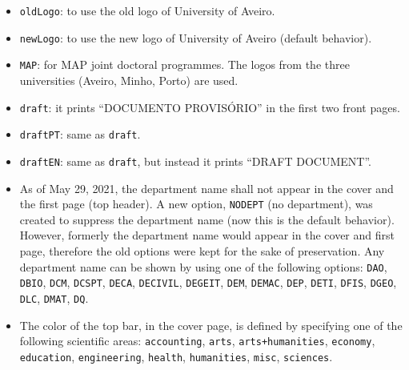 \begin{itemize}

\item
\texttt{oldLogo}: to use the old logo of University of Aveiro.

\item
\texttt{newLogo}: to use the new logo of University of Aveiro (default behavior).

\item
\texttt{MAP}: for MAP joint doctoral programmes. The logos from the three universities (Aveiro, Minho, Porto) are used.

\item
\texttt{draft}: it prints ``DOCUMENTO PROVISÓRIO'' in the first two front pages.

\item
\texttt{draftPT}: same as \texttt{draft}.

\item
\texttt{draftEN}: same as \texttt{draft}, but instead it prints ``DRAFT DOCUMENT''.

\item
As of May 29, 2021, the department name shall not appear in the cover and the first page (top header).
A new option, \texttt{NODEPT} (no department), was created to suppress the department name (now this is the default behavior).\\
However, formerly the department name would appear in the cover and first page, therefore the old options were kept for the sake of preservation.
Any department name can be shown by using one of the following options: \texttt{DAO}, \texttt{DBIO}, \texttt{DCM}, \texttt{DCSPT}, \texttt{DECA}, \texttt{DECIVIL}, \texttt{DEGEIT}, \texttt{DEM}, \texttt{DEMAC}, \texttt{DEP}, \texttt{DETI}, \texttt{DFIS}, \texttt{DGEO}, \texttt{DLC}, \texttt{DMAT}, \texttt{DQ}.

\item
The color of the top bar, in the cover page, is defined by specifying one of the following scientific areas: \texttt{accounting}, \texttt{arts}, \texttt{arts+humanities}, \texttt{economy}, \texttt{education}, \texttt{engineering}, \texttt{health}, \texttt{humanities}, \texttt{misc}, \texttt{sciences}.

\end{itemize}
